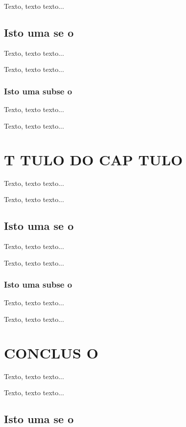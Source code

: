 \documentclass{article}
\begin{document}
Texto, texto texto...

\section{Isto   uma se o}

Texto, texto texto...

Texto, texto texto...

\subsection{Isto   uma subse o}

Texto, texto texto...

Texto, texto texto...


\chapter{T TULO DO CAP TULO}
\thispagestyle{myheadings}

Texto, texto texto...

Texto, texto texto...

\section{Isto   uma se o}

Texto, texto texto...

Texto, texto texto...

\subsection{Isto   uma subse o}

Texto, texto texto...

Texto, texto texto...


\chapter{CONCLUS O}
\thispagestyle{myheadings}

Texto, texto texto...

Texto, texto texto...

\section{Isto   uma se o}
\end{document}
